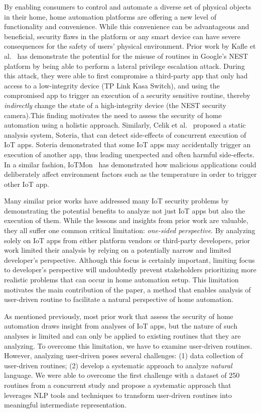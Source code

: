 By enabling consumers to control and automate a diverse set of physical objects in their home, home automation platforms are offering a new level of functionality and convenience. While this convenience can be advantageous and beneficial, security flaws in the platform or any smart device can have severe consequences for the safety of users' physical environment. Prior work by Kafle et al.~\cite{kmm+19} has demonstrate the potential for the misuse of routines in Google's NEST platform by being able to perform a lateral privilege escalation attack. During this attack, they were able to first compromise a third-party app that only had access to a low-integrity device (\eg TP Link Kasa Switch), and using the compromised app to trigger an execution of a security sensitive routine, thereby \textit{indirectly} change the state of a high-integrity device (\eg the NEST security camera).This finding motivates the need to assess the security of home automation using a holistic approach.
Similarly, Celik et al.~\cite{cmt18} proposed a static analysis system, Soteria, that can detect side-effects of concurrent execution of IoT apps. Soteria demonstrated that some IoT apps may accidentally trigger an execution of another app, thus leading unexpected and often harmful side-effects. In a similar fashion, IoTMon~\cite{dh18} has demonstrated how malicious applications could deliberately affect environment factors such as the temperature in order to trigger other IoT app. 

Many similar prior works have addressed many IoT security problems by demonstrating the potential benefits to analyze not just IoT apps but also the execution of them. While the lessons and insights from prior work are valuable, they all suffer one common critical limitation: \textit{one-sided perspective}. By analyzing solely on IoT apps from either platform vendors or third-party developers, prior work limited their analysis by relying on a potentially narrow and limited developer's perspective. Although this focus is certainly important, limiting focus to developer's perspective will undoubtedly prevent stakeholders prioritizing more realistic problems that can occur in home automation setup. This limitation motivates the main contribution of the paper, a method that enables analysis of user-driven routine to facilitate a natural perspective of home automation.


As mentioned previously, most prior work that assess the security of home automation draws insight from analyses of IoT apps, but the nature of such analyses is limited and can only be applied to existing routines that they are analyzing.
To overcome this limitation, we have to examine user-driven routines. However, analyzing user-driven poses several challenges: {\sf (1)} data collection of user-driven routines; {\sf (2)} develop a systematic approach to analyze \textit{natural} language. We were able to overcome the first challenge with a dataset of 250 routines from a concurrent study and propose a systematic approach that leverages NLP tools and techniques to transform user-driven routines into meaningful intermediate representation.



